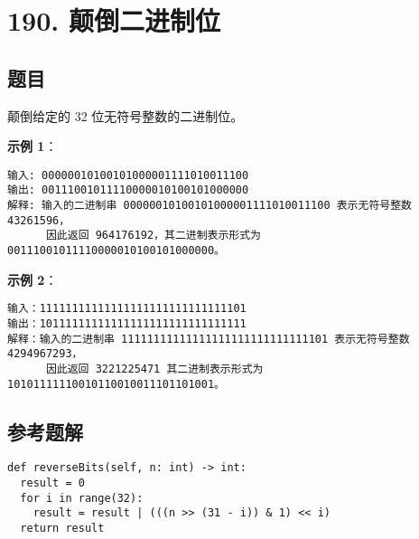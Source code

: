 \newpage
\section{190. 颠倒二进制位}
\label{leetcode:190}

\subsection{题目}

颠倒给定的 32 位无符号整数的二进制位。

\textbf{示例 1}：

\begin{verbatim}
输入: 00000010100101000001111010011100
输出: 00111001011110000010100101000000
解释: 输入的二进制串 00000010100101000001111010011100 表示无符号整数 43261596，
      因此返回 964176192，其二进制表示形式为 00111001011110000010100101000000。
\end{verbatim}

\textbf{示例 2}：

\begin{verbatim}
输入：11111111111111111111111111111101
输出：10111111111111111111111111111111
解释：输入的二进制串 11111111111111111111111111111101 表示无符号整数 4294967293，
      因此返回 3221225471 其二进制表示形式为 10101111110010110010011101101001。
\end{verbatim}

\subsection{参考题解}

\begin{verbatim}
def reverseBits(self, n: int) -> int:
  result = 0
  for i in range(32):
    result = result | (((n >> (31 - i)) & 1) << i)
  return result
\end{verbatim}
